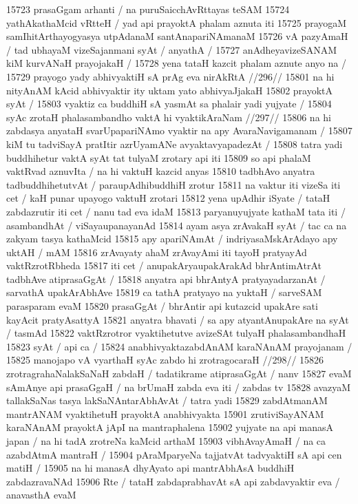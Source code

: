 15723 prasaGgam arhanti / na puruSaicchAvRttayas teSAM 
15724 yathAkathaMcid vRtteH / yad api prayoktA phalam aznuta iti  
15725 prayogaM samIhitArthayogyasya utpAdanaM santAnapariNAmanaM
15726 vA pazyAmaH / tad ubhayaM vizeSajanmani syAt / anyathA / 
15727 	anAdheyavizeSANAM kiM kurvANaH prayojakaH / 
15728 yena tataH kazcit phalam aznute anyo na /
15729 	prayogo yady abhivyaktiH sA prAg eva nirAkRtA //296//
15801 na hi nityAnAM kAcid abhivyaktir ity uktam yato abhivyaJjakaH 
15802 prayoktA syAt /
15803 	vyaktiz ca buddhiH sA yasmAt sa phalair yadi yujyate / 
15804 	syAc zrotaH phalasambandho vaktA hi vyaktikAraNam //297// 
15806 na hi zabdasya anyataH svarUpapariNAmo vyaktir na apy AvaraNavigamanam /
15807 kiM tu tadviSayA pratItir azrUyamANe avyaktavyapadezAt /  
15808 tatra yadi buddhihetur vaktA syAt tat tulyaM zrotary api iti  
15809 so api phalaM vaktRvad aznuvIta / na hi vaktuH kazcid anyas 
15810 tadbhAvo anyatra tadbuddhihetutvAt / paraupAdhibuddhiH  zrotur 
15811 na vaktur iti vizeSa iti cet / kaH punar upayogo vaktuH zrotari  
15812 yena upAdhir iSyate / tataH zabdazrutir iti cet / nanu tad eva idaM  
15813 paryanuyujyate kathaM tata iti / asambandhAt / viSayaupanayanAd  
15814 ayam asya zrAvakaH syAt / tac ca na zakyam tasya kathaMcid  
15815 apy apariNAmAt / indriyasaMskArAdayo apy uktAH / mAM 
15816 zrAvayaty ahaM zrAvayAmi iti tayoH pratyayAd vaktRzrotRbheda  
15817 iti cet / anupakAryaupakArakAd bhrAntimAtrAt tadbhAve atiprasaGgAt /
15818 anyatra api bhrAntyA pratyayadarzanAt / sarvathA upakArAbhAve 
15819 ca tathA pratyayo na yuktaH / sarveSAM parasparam evaM
15820 prasaGgAt / bhrAntir api kutazcid upakAre sati kayAcit  pratyAsattyA
15821 anyatra bhavati / sa apy atyantAnupakAre na syAt / tasmAd
15822 vaktRzrotror vyaktihetutve avizeSAt tulyaH phalasambandhaH
15823 syAt / api ca / 
15824 	anabhivyaktazabdAnAM karaNAnAM prayojanam /
15825 	manojapo vA vyarthaH syAc zabdo hi zrotragocaraH //298//
15826 zrotragrahaNalakSaNaH zabdaH / tadatikrame atiprasaGgAt / nanv  
15827 evaM sAmAnye api prasaGgaH / na brUmaH zabda eva iti / zabdas tv 
15828 avazyaM tallakSaNas tasya lakSaNAntarAbhAvAt /  tatra yadi
15829 zabdAtmanAM mantrANAM vyaktihetuH prayoktA anabhivyakta 
15901 zrutiviSayANAM karaNAnAM prayoktA jApI na mantraphalena 
15902 yujyate na api manasA japan / na hi tadA zrotreNa kaMcid arthaM
15903 vibhAvayAmaH / na ca azabdAtmA mantraH / 
15904 	pAraMparyeNa tajjatvAt tadvyaktiH sA api cen matiH / 
15905 na hi manasA dhyAyato api mantrAbhAsA buddhiH zabdazravaNAd
15906 Rte / tataH zabdaprabhavAt sA api zabdavyaktir eva / anavasthA evaM  
